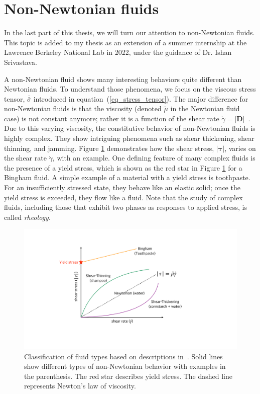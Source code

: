 \section{Non-Newtonian fluids}
\label{sec:intro_complex_fluid}
In the last part of this thesis, we will turn our attention to non-Newtonian fluids. This topic is added to my thesis as an extension of a summer internship at the Lawrence Berkeley National Lab in 2022, under the guidance of Dr. Ishan Srivastava. 
\par
\vphantom{text}
\par
A non-Newtonian fluid shows many interesting behaviors quite different than Newtonian fluids. To understand those phenomena, we focus on the viscous stress tensor, $\bar{\bar{\sigma}}$ introduced in equation~(\ref{eq_stress_tensor}). The major difference for non-Newtonian fluids is that the viscosity (denoted $\tilde{\mu}$ in the Newtonian fluid case) is not constant anymore; rather it is a function of the shear rate $\dot{\gamma} = \left| {\boldsymbol{D}} \right|$~\cite{kundu_chapter_2016}.
Due to this varying viscosity, the constitutive behavior of non-Newtonian fluids is highly complex. 
They show intriguing phenomena such as shear thickening, shear thinning, and jamming. Figure \ref{fig_rheology} demonstrates how the shear stress, $|\bm{\tau}|$, varies on the shear rate $\dot{\gamma}$, with an example.
One defining feature of many complex fluids is the presence of a yield stress, which is shown as the red star in Figure \ref{fig_rheology} for a Bingham fluid. A simple example of a material with a yield stress is toothpaste. For an insufficiently stressed state, they behave like an elastic solid; once the yield stress is exceeded, they flow like a fluid. Note that the study of complex fluids, including those that exhibit two phases as responses to applied stress, is called {\textit{rheology}}. 
\begin{figure}[h]
	\begin{center}
		\includegraphics[scale=0.25]{figures/fig_yield_stress_graph.pdf}
	\end{center}
   \caption{Classification of fluid types based on descriptions in~\cite{irgens_rheology_2014}. Solid lines show different types of non-Newtonian behavior with examples in the parenthesis. The red star describes yield stress. The dashed line represents Newton's law of viscosity.}
\label{fig_rheology}
\end{figure}
